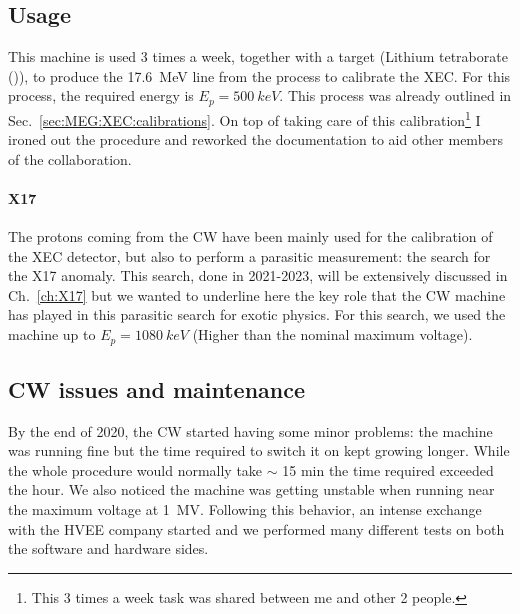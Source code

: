 \begin{refsection}
    \subsection{Usage}
        This machine is used 3 times a week, together with a  target (Lithium tetraborate ()), to produce the \SI{17.6}{MeV} line from the  process to calibrate the XEC. For this process, the required energy is $E_p=\SI{500}{keV}$.
        This process was already outlined in Sec.~\ref{sec:MEG:XEC:calibrations}.
        On top of taking care of this calibration\footnote {This 3 times a week task was shared between me and other 2 people.} 
        I ironed out the procedure and reworked the documentation to aid other members of the collaboration.
        
        \paragraph{X17} The protons coming from the CW have been mainly used for the calibration of the XEC detector, but also to perform a parasitic measurement: the search for the X17 anomaly.
        This search, done in 2021-2023, will be extensively discussed in Ch.~\ref{ch:X17} but we wanted to underline here the key role that the CW machine has played in this parasitic search for exotic physics. 
        For this search, we used the machine up to $E_p=\SI{1080}{keV}$ (Higher than the nominal maximum voltage).

    \subsection{CW issues and maintenance}
        By the end of 2020, the CW started having some minor problems: the machine was running fine but the time required to switch it on kept growing longer. 
        While the whole procedure would normally take $\sim$ 15 min the time required exceeded the hour.
        We also noticed the machine was getting unstable when running near the maximum voltage at \SI{1}{MV}.
        Following this behavior, an intense exchange with the HVEE company started and we performed many different tests on both the software and hardware sides.
    

\end{refsection}
